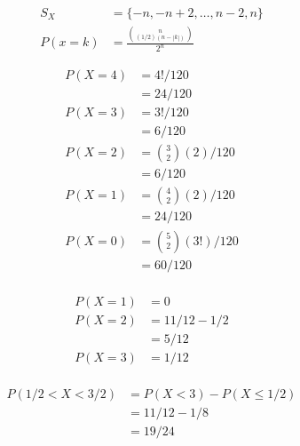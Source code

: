 \documentclass[12pt]{article}
\newenvironment{problem}[2][Problem]{\begin{trivlist}
\item[\hskip \labelsep {\bfseries #1}\hskip \labelsep {\bfseries #2.}]}{\end{trivlist}}
\begin{document}
\begin{problem}{9}
\end{problem}
\begin{align*}
	S_X &= \{ -n, -n+2, \ldots, n-2, n\} \\
	P(x=k) &= \frac{\binom{n}{(1/2)(n-|k|)}}{2^n}
\end{align*}  
\filbreak

\begin{problem}{10}
\end{problem}
\begin{align*}
	P(X=4) &= 4!/120 \\
	&= 24/120 \\
	P(X=3) &= 3!/120 \\
	&= 6/120\\
	P(X=2) &= \binom{3}{2}(2)/120 \\
	&= 6/120\\
	P(X=1) &= \binom{4}{2}(2)/120 \\
	&= 24/120\\
	P(X=0) &= \binom{5}{2}(3!)/120 \\
	&= 60/120\\
\end{align*}  
\filbreak

\begin{problem}{11.a}
\end{problem}
\begin{align*}
	P(X=1) &= 0 \\
	P(X=2) &= 11/12 - 1/2 \\
	&= 5/12 \\
	P(X=3) &= 1/12 \\
\end{align*}  
\filbreak

\begin{problem}{11.b}
\end{problem}
\begin{align*}
	P(1/2 < X < 3/2) &= P(X < 3) - P(X \le 1/2) \\
	&= 11/12 - 1/8 \\
	&= 19/24 
\end{align*}  
\filbreak
\end{document}
